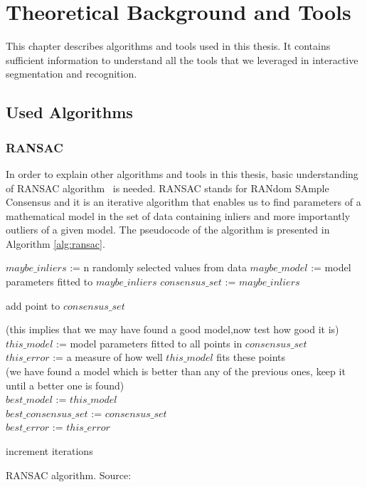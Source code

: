 \chapter{Theoretical Background and Tools}
\label{chapter:Background}
This chapter describes algorithms and tools used in this thesis. It contains sufficient information to understand all the tools that we leveraged in interactive segmentation and recognition.
\section{Used Algorithms}
\subsection{RANSAC}
In order to explain other algorithms and tools in this thesis, basic understanding of RANSAC algorithm~\cite{ransac} is needed. RANSAC stands for RANdom SAmple Consensus and it is an iterative algorithm that enables us to find parameters of a mathematical model in the set of data containing inliers and more importantly outliers of a given model. The pseudocode of the algorithm is presented in Algorithm \ref{alg:ransac}. 

\begin{algorithm}[htb!]
{
$maybe\_inliers$ := n randomly selected values from data
$maybe\_model$ := model parameters fitted to $maybe\_inliers$
$consensus\_set$ := $maybe\_inliers$

{

{
add point to $consensus\_set$
}

}

{
(this implies that we may have found a good model,now test how good it is)\\
$this\_model$ := model parameters fitted to all points in $consensus\_set$\\
$this\_error$ := a measure of how well $this\_model$ fits these points\\



{            (we have found a model which is better than any of the previous ones,
            keep it until a better one is found)\\
            $best\_model$ := $this\_model$\\
            $best\_consensus\_set$ := $consensus\_set$\\
            $best\_error$ := $this\_error$\\
}


}
    increment iterations

}


\caption{RANSAC algorithm. Source:~\cite{ransac}}
  \label{alg:ransac}
\end{algorithm}

